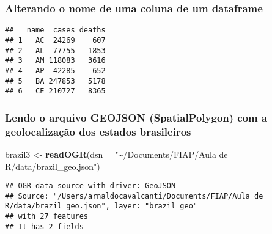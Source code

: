 \documentclass[
]{article}
\newenvironment{Shaded}{\begin{snugshade}}{\end{snugshade}}
\newcommand{\DataTypeTok}[1]{\textcolor[rgb]{0.13,0.29,0.53}{#1}}
\newcommand{\DecValTok}[1]{\textcolor[rgb]{0.00,0.00,0.81}{#1}}
\newcommand{\KeywordTok}[1]{\textcolor[rgb]{0.13,0.29,0.53}{\textbf{#1}}}
\newcommand{\NormalTok}[1]{#1}
\newcommand{\OperatorTok}[1]{\textcolor[rgb]{0.81,0.36,0.00}{\textbf{#1}}}
\newcommand{\StringTok}[1]{\textcolor[rgb]{0.31,0.60,0.02}{#1}}
\begin{document}
\hypertarget{alterando-o-nome-de-uma-coluna-de-um-dataframe}{%
\subsubsection{Alterando o nome de uma coluna de um
dataframe}\label{alterando-o-nome-de-uma-coluna-de-um-dataframe}}

\begin{Shaded}
\end{Shaded}

\begin{verbatim}
##   name  cases deaths
## 1   AC  24269    607
## 2   AL  77755   1853
## 3   AM 118083   3616
## 4   AP  42285    652
## 5   BA 247853   5178
## 6   CE 210727   8365
\end{verbatim}

\hypertarget{lendo-o-arquivo-geojson-spatialpolygon-com-a-geolocalizauxe7uxe3o-dos-estados-brasileiros}{%
\subsubsection{Lendo o arquivo GEOJSON (SpatialPolygon) com a
geolocalização dos estados
brasileiros}\label{lendo-o-arquivo-geojson-spatialpolygon-com-a-geolocalizauxe7uxe3o-dos-estados-brasileiros}}

\begin{Shaded}
\begin{Highlighting}[]
\NormalTok{brazil3 \textless{}{-}}\StringTok{ }\KeywordTok{readOGR}\NormalTok{(}\DataTypeTok{dsn =} \StringTok{"\textasciitilde{}/Documents/FIAP/Aula de R/data/brazil\_geo.json"}\NormalTok{)}
\end{Highlighting}
\end{Shaded}

\begin{verbatim}
## OGR data source with driver: GeoJSON 
## Source: "/Users/arnaldocavalcanti/Documents/FIAP/Aula de R/data/brazil_geo.json", layer: "brazil_geo"
## with 27 features
## It has 2 fields
\end{verbatim}
\end{document}
